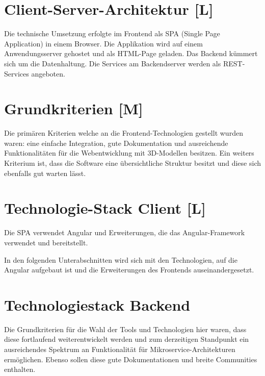 \section{Client-Server-Architektur [L]}
Die technische Umsetzung erfolgte im Frontend als SPA (Single Page Application) in einem Browser. Die Applikation wird auf einem Anwendungsserver gehostet und als HTML-Page geladen. Das Backend kümmert sich um die Datenhaltung. Die Services am Backendserver werden als REST-Services angeboten.

\section{Grundkriterien [M]} 
Die primären Kriterien welche an die Frontend-Technologien gestellt wurden waren: eine einfache Integration, gute Dokumentation und ausreichende Funktionalitäten für die Webentwicklung mit 3D-Modellen besitzen. Ein weiters Kriterium ist, dass die Software eine übersichtliche Struktur besitzt und diese sich ebenfalls gut warten lässt. 

  

\section{Technologie-Stack Client [L]}
Die SPA verwendet Angular und Erweiterungen, die das Angular-Framework verwendet und bereitstellt.

In den folgenden Unterabschnitten wird sich mit den Technologien, auf die Angular aufgebaut ist und die Erweiterungen des Frontends auseinandergesetzt.





\section{Technologiestack Backend}
Die Grundkriterien für die Wahl der Tools und Technologien hier waren, dass diese fortlaufend weiterentwickelt werden und zum derzeitigen Standpunkt ein ausreichendes Spektrum an Funktionalität für Mikroservice-Architekturen ermöglichen.\cite{MicroserviceAbout} Ebenso sollen diese gute Dokumentationen und breite Communities enthalten. 



